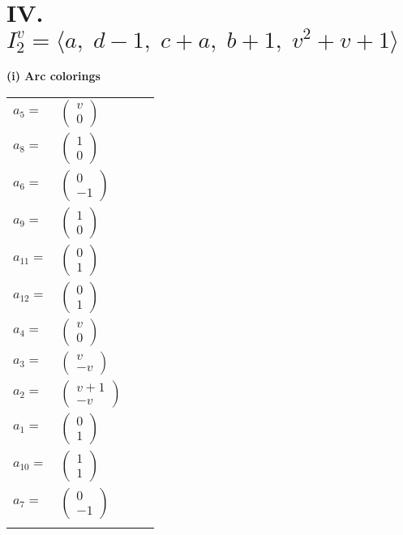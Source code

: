 \documentclass[1p]{elsarticle_modified}
\theoremstyle{definition}
\begin{document}
\centering \section*{IV. $I^v_{2}= \langle a,\;d-1,\;c+a,\;b+1,\;v^2+v+1 \rangle$}
\flushleft \textbf{(i) Arc colorings}\\
\begin{tabular}{m{7pt} m{180pt} m{7pt} m{180pt} }
\flushright $a_{5}=$&$\begin{pmatrix}v\\0\end{pmatrix}$ \\
\flushright $a_{8}=$&$\begin{pmatrix}1\\0\end{pmatrix}$ \\
\flushright $a_{6}=$&$\begin{pmatrix}0\\-1\end{pmatrix}$ \\
\flushright $a_{9}=$&$\begin{pmatrix}1\\0\end{pmatrix}$ \\
\flushright $a_{11}=$&$\begin{pmatrix}0\\1\end{pmatrix}$ \\
\flushright $a_{12}=$&$\begin{pmatrix}0\\1\end{pmatrix}$ \\
\flushright $a_{4}=$&$\begin{pmatrix}v\\0\end{pmatrix}$ \\
\flushright $a_{3}=$&$\begin{pmatrix}v\\- v\end{pmatrix}$ \\
\flushright $a_{2}=$&$\begin{pmatrix}v+1\\- v\end{pmatrix}$ \\
\flushright $a_{1}=$&$\begin{pmatrix}0\\1\end{pmatrix}$ \\
\flushright $a_{10}=$&$\begin{pmatrix}1\\1\end{pmatrix}$ \\
\flushright $a_{7}=$&$\begin{pmatrix}0\\-1\end{pmatrix}$\\&\end{tabular}
\end{document}
